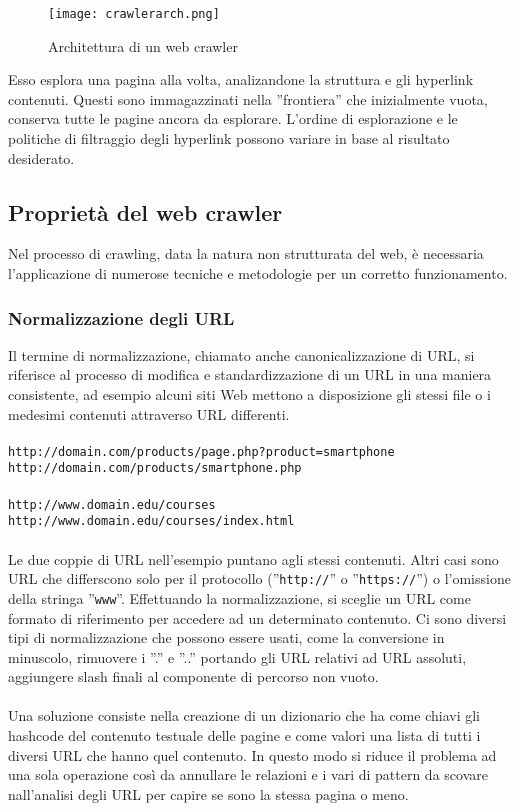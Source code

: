 \begin{figure}[htb]
	\centering
	\texttt{[image: crawlerarch.png]}
	\caption{Architettura di un web crawler}
	\label{crawlerarch}
\end{figure}
Esso esplora una pagina alla volta, analizandone la struttura e gli hyperlink contenuti. Questi sono immagazzinati nella ''frontiera'' che inizialmente vuota, conserva tutte le pagine ancora da esplorare. L'ordine di esplorazione e le politiche di filtraggio degli hyperlink possono variare in base al risultato desiderato. 

\subsection{Proprietà del web crawler}
Nel processo di crawling, data la natura non strutturata del web, è necessaria l'applicazione di numerose tecniche e metodologie per un corretto funzionamento.

\subsubsection{Normalizzazione degli URL}
Il termine di normalizzazione, chiamato anche canonicalizzazione di URL, si riferisce al processo di modifica e standardizzazione di un URL in una maniera consistente, ad esempio alcuni siti Web mettono a disposizione gli stessi file o i medesimi contenuti attraverso URL differenti. 
\\\\
\texttt{http://domain.com/products/page.php?product=smartphone}
\\
\texttt{http://domain.com/products/smartphone.php}
\\\\
\texttt{http://www.domain.edu/courses}
\\
\texttt{http://www.domain.edu/courses/index.html}
\\\\
Le due coppie di URL nell’esempio puntano agli stessi contenuti. Altri casi sono URL che differscono solo per il protocollo (''\texttt{http://}'' o ''\texttt{https://}'') o l'omissione della stringa ''\texttt{www}''. Effettuando la normalizzazione, si sceglie un URL come formato di riferimento per accedere ad un determinato contenuto. Ci sono diversi tipi di normalizzazione che possono essere usati, come la conversione in minuscolo, rimuovere i ''.'' e ''..'' portando gli URL relativi ad URL assoluti, aggiungere slash finali al componente di percorso non vuoto.
\\\\
Una soluzione consiste nella creazione di un dizionario che ha come chiavi gli hashcode del contenuto testuale delle pagine e come valori una lista di tutti i diversi URL che hanno quel contenuto. In questo modo si riduce il problema ad una sola operazione così da annullare le relazioni e i vari di pattern da scovare nall'analisi degli URL per capire se sono la stessa pagina o meno. 

